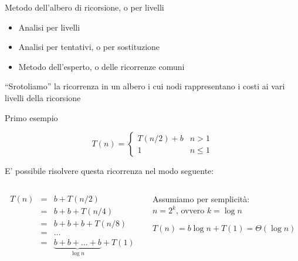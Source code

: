 \begin{frame}{Metodo dell'albero di ricorsione, o per livelli}

\begin{myboxtitle}
\begin{itemize}
\item \alert{Analisi per livelli}
\item Analisi per tentativi, o per sostituzione
\item Metodo dell'esperto, o delle ricorrenze comuni
\end{itemize}
\end{myboxtitle}


\begin{myboxtitle}
“Srotoliamo” la ricorrenza in un albero i cui nodi rappresentano i costi ai vari livelli della ricorsione
\end{myboxtitle}

\end{frame}

\begin{frame}{Primo esempio}

\vspace{-6pt}
\begin{mybox}
\[
T(n) = 
  \begin{cases}
     T(n/2) + b & n > 1 \\
     1 & n \leq 1
  \end{cases} 
\]
\end{mybox}

E' possibile risolvere questa ricorrenza nel modo seguente:

\begin{columns}
\begin{column}{0.54\textwidth}
\begin{eqnarray*}
T(n) &=& b + T(n/2) \\
     &=& b + b + T(n/4) \\
     &=& b + b + b + T(n/8) \\
     &=& \ldots \\
     &=& \underbrace{b + b + \ldots + b }_{\log n}+ T(1)
\end{eqnarray*}

\end{column}
\begin{column}{0.45\textwidth}
\begin{mybox}
Assumiamo per semplicità:\\
$n=2^k$, ovvero $k = \log n$
\end{mybox}	
\begin{mybox}
$T(n) = b \log n + T(1) = \Theta(\log n)$	
\end{mybox}	
\end{column}
\end{columns}


\end{frame}

